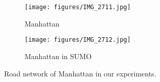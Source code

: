 \begin{itemize}[wide,noitemsep,topsep=0pt]
\begin{figure}[t!]
  \centering
        \begin{subfigure}[t]{.2\textwidth}
         \texttt{[image: figures/IMG\_2711.jpg]}
                \caption{Manhattan}

        \end{subfigure}
        \hfill
            \begin{subfigure}[t]{.2\textwidth}
         \texttt{[image: figures/IMG\_2712.jpg]}
                \caption{Manhattan in SUMO}
        \end{subfigure}

  \caption{Road network of Manhattan in our experiments.}
  \label{fig:road-net}
\end{figure}
\end{itemize}
